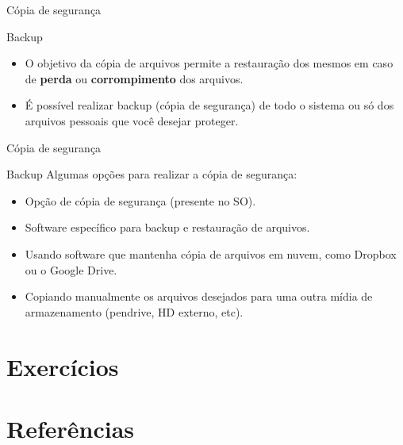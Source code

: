 \begin{frame}{Cópia de segurança}
	\begin{block}{Backup}
		\begin{itemize}
			\item O objetivo da cópia de arquivos permite a restauração dos mesmos em caso de \textbf{perda} ou \textbf{corrompimento} dos arquivos.
			\item É possível realizar backup (cópia de segurança) de todo o sistema ou só dos arquivos pessoais que você desejar proteger.
		\end{itemize}
	\end{block}
\end{frame}


\begin{frame}{Cópia de segurança}
	\begin{block}{Backup}
		Algumas opções para realizar a cópia de segurança:
		\begin{itemize}
			\item Opção de cópia de segurança (presente no SO).
			\item Software específico para backup e restauração de arquivos.
			\item Usando software que mantenha cópia de arquivos em nuvem, como Dropbox ou o Google Drive.
			\item Copiando manualmente os arquivos desejados para uma outra mídia de armazenamento (pendrive, HD externo, etc).
		\end{itemize}
	\end{block}
\end{frame}


\section*{Exercícios}

\section*{Referências}

